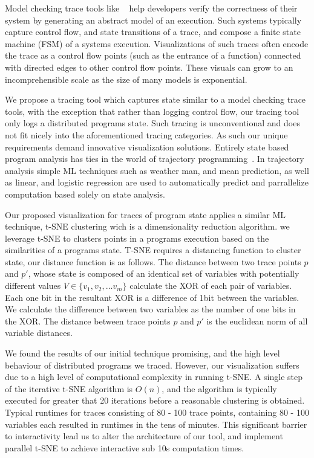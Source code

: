 Model checking trace tools like
~\cite{Beschastnikh:2014:IMC:2568225:2568246,Barham03magpie:online,Walker98visualizingdynamic}
help developers verify the correctness of their system by generating an
abstract model of an execution. Such systems typically capture control
flow, and state transitions of a trace, and compose a finite state
machine (FSM) of a systems execution. Visualizations of such traces
often encode the trace as a control flow points (such as the entrance
of a function) connected with directed edges to other control flow
points. These visuals can grow to an incomprehensible scale as the
size of many models is exponential.

We propose a tracing tool which captures state similar to a model
checking trace tools, with the exception that rather than logging
control flow, our tracing tool only logs a distributed programs state.
Such tracing is unconventional and does not fit nicely into the
aforementioned tracing categories. As such our unique requirements
demand innovative visualization solutions. Entirely state based program
analysis has ties in the world of trajectory
programming~\cite{Waterland:2014:AAS:2654822.2541985,181250,Waterland:2013:CC:2485732.2485749}.
In trajectory analysis simple ML techniques such as weather man, and
mean prediction, as well as linear, and logistic regression are used
to automatically predict and parrallelize computation based solely on
state analysis.

Our proposed visualization for traces of program state applies a similar ML
technique, t-SNE clustering wich is a dimensionality reduction
algorithm. we leverage t-SNE to clusters points in a programs
execution based on the similarities of a programs state.  T-SNE requires a
distancing function to cluster state, our distance function is as follows. The
distance between two trace points $p$ and $p'$, whose state is composed of an
identical set of variables with potentially different values $V \in \{v_1, v_2,
\dots v_m\}$ calculate the XOR of each pair of variables. Each one bit in the
resultant XOR is a difference of 1bit between the variables. We calculate the
difference between two variables as the number of one bits in the XOR. The
distance between trace points $p$ and $p'$ is the euclidean norm of all
variable distances.

We found the results of our initial technique promising, and the high level
behaviour of distributed programs we traced. However, our visualization suffers
due to a high level of computational complexity in running t-SNE. A single step
of the iterative t-SNE algorithm is $O(n)$, and the algorithm is typically
executed for greater that 20 iterations before a reasonable clustering is
obtained. Typical runtimes for traces consisting of 80 - 100 trace points,
containing 80 - 100 variables each resulted in runtimes in the tens of minutes.
This significant barrier to interactivity lead us to alter the architecture of
our tool, and implement parallel t-SNE to achieve interactive sub 10s
computation times.   

